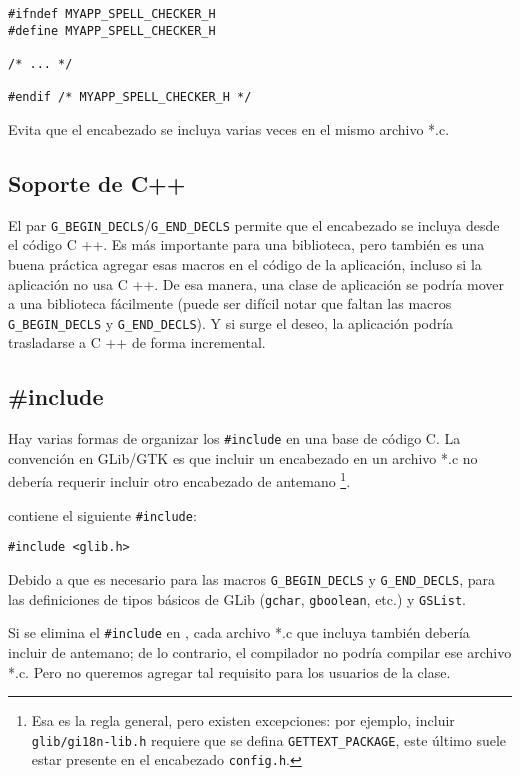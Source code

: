 \begin{lstlisting}[style=GLib/GTK]
#ifndef MYAPP_SPELL_CHECKER_H
#define MYAPP_SPELL_CHECKER_H

/* ... */

#endif /* MYAPP_SPELL_CHECKER_H */
\end{lstlisting}

Evita que el encabezado se incluya varias veces en el mismo archivo *.c.

\subsection{Soporte de C++}
El par \lstinline{G_BEGIN_DECLS}/\lstinline{G_END_DECLS} permite que el encabezado se incluya desde el código C ++. Es más importante para una biblioteca, pero también es una buena práctica agregar esas macros en el código de la aplicación, incluso si la aplicación no usa C ++. De esa manera, una clase de aplicación se podría mover a una biblioteca fácilmente (puede ser difícil notar que faltan las macros \lstinline{G_BEGIN_DECLS} y \lstinline{G_END_DECLS}). Y si surge el deseo, la aplicación podría trasladarse a C ++ de forma incremental.

\subsection{\#include}
\label{oop-semi-include-in-header}
Hay varias formas de organizar los \lstinline{#include} en una base de código C. La convención en GLib/GTK es que incluir un encabezado en un archivo *.c no debería requerir incluir otro encabezado de antemano \footnote{Esa es la regla general, pero existen excepciones: por ejemplo, incluir \lstinline{glib/gi18n-lib.h} requiere que se defina \lstinline{GETTEXT_PACKAGE}, este último suele estar presente en el encabezado \lstinline{config.h}.}.

 contiene el siguiente \lstinline{#include}:
\begin{lstlisting}[style=GLib/GTK]
#include <glib.h>
\end{lstlisting}

Debido a que  es necesario para las macros \lstinline{G_BEGIN_DECLS} y \lstinline{G_END_DECLS}, para las definiciones de tipos básicos de GLib (\lstinline{gchar}, \lstinline{gboolean}, etc.) y \lstinline{GSList}.

Si se elimina el \lstinline{#include} en , cada archivo *.c que incluya  también debería incluir  de antemano; de lo contrario, el compilador no podría compilar ese archivo *.c. Pero no queremos agregar tal requisito para los usuarios de la clase.

